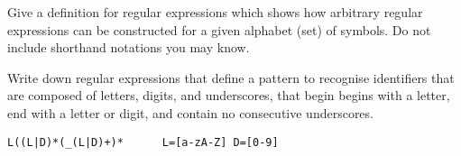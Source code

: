 \documentclass[11pt]{cityexam}
\begin{document}
\begin{questions}
\begin{subquestions}
%
%
%
%

\subquestion
Give a definition for regular expressions which shows how
arbitrary regular expressions can be constructed for a
given alphabet (set) of symbols. Do not include shorthand
notations you may know.

\subquestion
Write down regular expressions that define a pattern to recognise
identifiers that are composed of letters, digits, and underscores, that begin
begins with a letter, end with a letter or digit, and contain
no consecutive underscores.
\begin{modelanswer}
\begin{verbatim}
L((L|D)*(_(L|D)+)*      L=[a-zA-Z] D=[0-9]
\end{verbatim}
\end{modelanswer}


\end{subquestions}
\end{questions}
\end{document}
